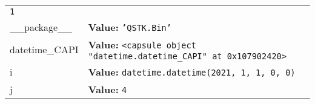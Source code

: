 \begin{longtable}{|p{\varnamewidth}|p{\vardescrwidth}|l}
{\tt 1}&\\
\cline{1-2}
\raggedright \_\-\_\-p\-a\-c\-k\-a\-g\-e\-\_\-\_\- & \raggedright \textbf{Value:} 
{\tt \texttt{'}\texttt{QSTK.Bin}\texttt{'}}&\\
\cline{1-2}
\raggedright d\-a\-t\-e\-t\-i\-m\-e\-\_\-C\-A\-P\-I\- & \raggedright \textbf{Value:} 
{\tt {\textless}capsule object "datetime.datetime\_CAPI" at 0x107902420{\textgreater}}&\\
\cline{1-2}
\raggedright i\- & \raggedright \textbf{Value:} 
{\tt datetime.datetime(2021, 1, 1, 0, 0)}&\\
\cline{1-2}
\raggedright j\- & \raggedright \textbf{Value:} 
{\tt 4}&\\
\cline{1-2}
\end{longtable}

